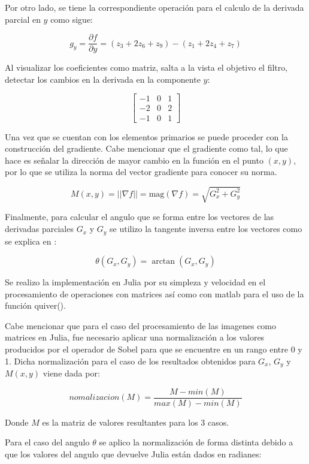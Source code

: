 \documentclass[11pt, letterpaper]{article}
\begin{document}
	
	Por otro lado, se tiene la correspondiente operación para el calculo de la derivada parcial en $y$ como sigue:	
	
	$$g_y = \frac{\partial f}{\partial y} = (z_3 + 2z_6 + z_9) - (z_1 + 2z_4 + z_7)$$

	\newpage
	
	Al visualizar los coeficientes como matriz, salta a la vista el objetivo el filtro, detectar los cambios en la derivada en la componente $y$:
	
	$$
	\begin{bmatrix}
		-1 & 0 & 1 \\
		-2 & 0 & 2 \\
		-1 & 0 & 1
	\end{bmatrix}
	$$
	
	Una vez que se cuentan con los elementos primarios se puede proceder con la construcción del gradiente. Cabe mencionar que el gradiente como tal, lo que hace es señalar la dirección de mayor cambio en la función en el punto $(x,y)$, por lo que se utiliza la norma del vector gradiente para conocer su norma.
	
	$$M(x, y) = ||\nabla f|| = \text{mag}(\nabla f) = \sqrt{G_x^2 + G_y^2}$$
	
	Finalmente, para calcular el angulo que se forma entre los vectores de las derivadas parciales $G_x$ y $G_y$ se utilizo la tangente inversa entre los vectores como se explica en \cite{perez2018procesamiento}:
	
	$$\theta(G_x,G_y) = \arctan(G_x,G_y )$$
	
	Se realizo la implementación en Julia por su simpleza y velocidad en el procesamiento de operaciones con matrices así como con matlab para el uso de la función quiver().
	
	Cabe mencionar que para el caso del procesamiento de las imagenes como matrices en Julia, fue necesario aplicar una normalización a los valores producidos por el operador de Sobel para que se encuentre en un rango entre 0 y 1. Dicha normalización para el caso de los resultados obtenidos para $G_x$, $G_y$ y $M(x,y)$ viene dada por:
	
	$$nomalizacion(M) = \frac{M-min(M)}{max(M)-min(M)}$$
	
	Donde $M$ es la matriz de valores resultantes para los 3 casos.
	
	Para el caso del angulo $\theta$ se aplico la normalización de forma distinta debido a que los valores  del angulo que devuelve Julia están dados en radianes:
	
\end{document}
